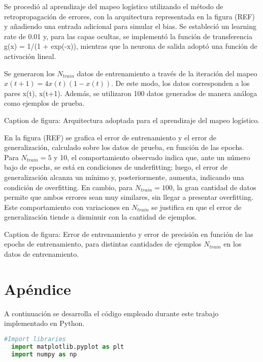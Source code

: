 \documentclass[aps,prb,twocolumn,superscriptaddress,floatfix,longbibliography]{revtex4-2}
\newcounter{para}
\begin{document}
Se procedió al aprendizaje del mapeo logístico utilizando el método de retropropagación de errores, con la arquitectura representada en la figura (REF) y añadiendo una entrada adicional para simular el bias. Se estableció un learning rate de 0.01 y, para las capas ocultas, se implementó la función de transferencia g(x) = 1/(1 + exp(-x)), mientras que la neurona de salida adoptó una función de activación lineal.

Se generaron los \(N_{train}\) datos de entrenamiento a través de la iteración del mapeo \(x(t + 1) = 4x(t)(1-x(t))\). De este modo, los datos corresponden a los pares {x(t), x(t+1)}. Además, se utilizaron 100 datos generados de manera análoga como ejemplos de prueba.

Caption de figura: Arquitectura adoptada para el aprendizaje del mapeo logístico.

En la figura (REF) se grafica el error de entrenamiento y el error de generalización, calculado sobre los datos de prueba, en función de las epochs. Para \(N_{train} = 5\) y 10, el comportamiento observado indica que, ante un número bajo de epochs, se está en condiciones de underfitting; luego, el error de generalización alcanza un mínimo y, posteriormente, aumenta, indicando una condición de overfitting. En cambio, para \(N_{train} = 100\), la gran cantidad de datos permite que ambos errores sean muy similares, sin llegar a presentar overfitting. Este comportamiento con variaciones en \(N_{train}\) se justifica en que el error de generalización tiende a disminuir con la cantidad de ejemplos.

Caption de figura: Error de entrenamiento y error de precisión en función de las epochs de entrenamiento, para distintas cantidades de ejemplos \(N_{train}\) en los datos de entrenamiento.

\onecolumngrid

\section{Apéndice}
A continuación se desarrolla el código empleado durante este trabajo implementado en Python.




\begin{lstlisting}[language=Python]
  #Import libraries
  import matplotlib.pyplot as plt
  import numpy as np
  

\end{lstlisting}


\end{document}
